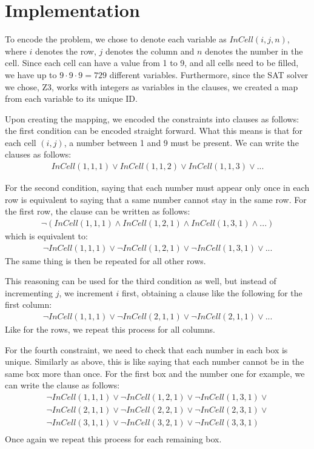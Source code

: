 \documentclass[12pt,a4paper]{article}
\begin{document}
\section*{Implementation}
To encode the problem, we chose to denote each variable as $InCell(i,j,n)$, where $i$ denotes the row, $j$ denotes the column and $n$ denotes the number in the cell.
Since each cell can have a value from 1 to 9, and all cells need to be filled, we have up to $9\cdot9\cdot9 = 729$ different variables.
Furthermore, since the SAT solver we chose, Z3, works with integers as variables in the clauses, we created a map from each variable to its unique ID.

Upon creating the mapping, we encoded the constraints into clauses as follows: the first condition can be encoded straight forward. What this means is that for each cell $(i,j)$, a number between 1 and 9 must be present. We can write the clauses as follows:
\begin{align*}
  InCell(1,1,1) \vee InCell(1,1,2) \vee InCell(1,1,3) \vee ...
\end{align*}

For the second condition, saying that each number must appear only once in each row is equivalent to saying that a same number cannot stay in the same row. For the first row, the clause can be written as follows:
\begin{align*}
  \neg(InCell(1,1,1) \wedge InCell(1,2,1) \wedge InCell(1,3,1) \wedge ...)
\end{align*}
which is equivalent to:
\begin{align*}
  \neg InCell(1,1,1) \vee \neg InCell(1,2,1) \vee \neg InCell(1,3,1) \vee ...
\end{align*}
The same thing is then be repeated for all other rows.
\medskip

This reasoning can be used for the third condition as well, but instead of incrementing $j$, we increment $i$ first, obtaining a clause like the following for the first column:
\begin{align*}
  \neg InCell(1,1,1) \vee \neg InCell(2,1,1) \vee \neg InCell(2,1,1) \vee ...
\end{align*}
Like for the rows, we repeat this process for all columns.
\medskip

For the fourth constraint, we need to check that each number in each box is unique. Similarly as above, this is like saying that each number cannot be in the same box more than once. For the first box and the number one for example, we can write the clause as follows:
\begin{align*}
  \neg InCell(1,1,1) \vee \neg InCell(1,2,1) \vee \neg InCell(1,3,1) \vee \\
  \neg InCell(2,1,1) \vee \neg InCell(2,2,1) \vee \neg InCell(2,3,1) \vee \\
  \neg InCell(3,1,1) \vee \neg InCell(3,2,1) \vee \neg InCell(3,3,1) \\
\end{align*}
Once again we repeat this process for each remaining box.
\medskip
\end{document}
